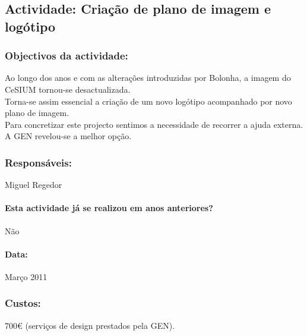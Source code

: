 \subsection*{Actividade: Criação de plano de imagem e logótipo} 

\subsubsection*{Objectivos da actividade:}
\indent Ao longo dos anos e com as alterações introduzidas por Bolonha, a imagem do CeSIUM tornou-se desactualizada.\\
\indent Torna-se assim essencial a criação de um novo logótipo acompanhado por novo plano de imagem.\\
\indent Para concretizar este projecto sentimos a necessidade de recorrer a ajuda externa. A GEN revelou-se a melhor opção.\\

\subsubsection*{Responsáveis:}
\begin{itemizedash}
  \item{Miguel Regedor}
\end{itemizedash}

\paragraph{Esta actividade já se realizou em anos anteriores?}
Não

\paragraph{Data:}
Março 2011 

\subsubsection*{Custos:}
700€ (serviços de design prestados pela GEN).
